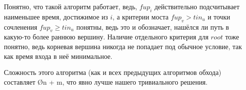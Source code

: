 Понятно, что такой алгоритм работает, ведь, $fup_i$ действительно подсчитывает наименьшее время, достижимое из $i$, а критерии моста $fup_v > tin_u$ и точки сочленения $fup_v \geq tin_u$ понятны, ведь это и обозначает, нашёлся ли путь в какую-то более раннюю вершину. Наличие отдельного критерия для $root$ тоже понятно, ведь корневая вершина никогда не попадает под обычное условие, так как время входа в неё минимальное.

Сложность этого алгоритма (как и всех предыдущих алгоритмов обхода) составляет \O{n + m}, что явно лучше нашего тривиального решения.
